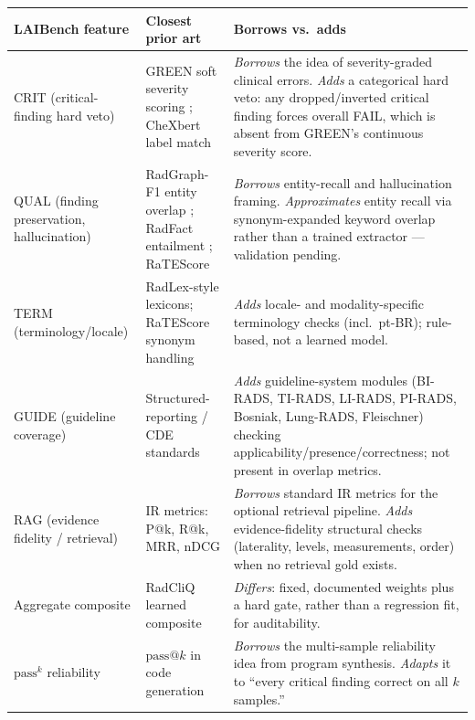 \documentclass[11pt]{article}
\newcommand{\dimname}[1]{\textsc{#1}}
\newcommand{\passk}{$\mathrm{pass}^{k}$}
\begin{document}
\begin{table}[t]
\centering
\small
\setlength{\tabcolsep}{4pt}
\renewcommand{\arraystretch}{1.25}
\begin{tabular}{@{}p{2.2cm}p{4.3cm}p{6.0cm}@{}}
\toprule
\textbf{LAIBench feature} & \textbf{Closest prior art} & \textbf{Borrows vs.\ adds} \\
\midrule
\dimname{CRIT} (critical-finding hard veto) &
GREEN soft severity scoring \cite{Ostmeier2024GREEN}; CheXbert label match
\cite{Smit2020CheXbert} &
\emph{Borrows} the idea of severity-graded clinical errors. \emph{Adds} a
categorical hard veto: any dropped/inverted critical finding forces overall
\dimname{FAIL}, which is absent from GREEN's continuous severity score. \\
\dimname{QUAL} (finding preservation, hallucination) &
RadGraph-F1 entity overlap \cite{Jain2021RadGraph}; RadFact entailment
\cite{Bannur2024RadFact}; RaTEScore \cite{Zhao2024RaTEScore} &
\emph{Borrows} entity-recall and hallucination framing. \emph{Approximates}
entity recall via synonym-expanded keyword overlap rather than a trained
extractor --- validation pending. \\
\dimname{TERM} (terminology/locale) &
RadLex-style lexicons; RaTEScore synonym handling \cite{Zhao2024RaTEScore} &
\emph{Adds} locale- and modality-specific terminology checks (incl.\ pt-BR);
rule-based, not a learned model. \\
\dimname{GUIDE} (guideline coverage) &
Structured-reporting / CDE standards \cite{ESR2023Structured} &
\emph{Adds} guideline-system modules (BI-RADS, TI-RADS, LI-RADS, PI-RADS,
Bosniak, Lung-RADS, Fleischner) checking applicability/presence/correctness; not
present in overlap metrics. \\
\dimname{RAG} (evidence fidelity / retrieval) &
IR metrics: P@k, R@k, MRR, nDCG \cite{JarvelinKekalainen2002} &
\emph{Borrows} standard IR metrics for the optional retrieval pipeline.
\emph{Adds} evidence-fidelity structural checks (laterality, levels,
measurements, order) when no retrieval gold exists. \\
Aggregate composite &
RadCliQ learned composite \cite{Yu2023RadCliQ} &
\emph{Differs}: fixed, documented weights plus a hard gate, rather than a
regression fit, for auditability. \\
\passk{} reliability &
$\mathrm{pass@}k$ in code generation \cite{Chen2021Codex} &
\emph{Borrows} the multi-sample reliability idea from program synthesis.
\emph{Adapts} it to ``every critical finding correct on all $k$ samples.'' \\

\end{tabular}
\end{table}
\end{document}

